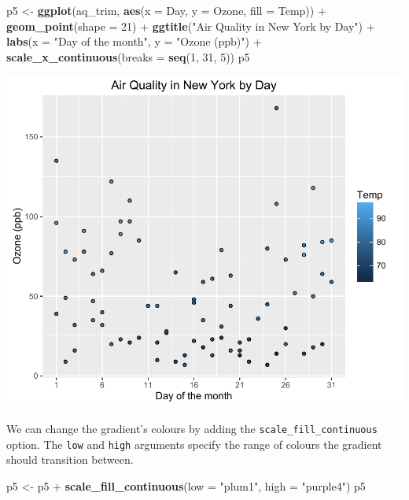 \documentclass[]{article}
\newenvironment{Shaded}{\begin{snugshade}}{\end{snugshade}}
\newcommand{\KeywordTok}[1]{\textcolor[rgb]{0.13,0.29,0.53}{\textbf{{#1}}}}
\newcommand{\DataTypeTok}[1]{\textcolor[rgb]{0.13,0.29,0.53}{{#1}}}
\newcommand{\DecValTok}[1]{\textcolor[rgb]{0.00,0.00,0.81}{{#1}}}
\newcommand{\StringTok}[1]{\textcolor[rgb]{0.31,0.60,0.02}{{#1}}}
\newcommand{\NormalTok}[1]{{#1}}
\begin{document}
\begin{Shaded}
\begin{Highlighting}[]
\NormalTok{p5 <-}\StringTok{ }\KeywordTok{ggplot}\NormalTok{(aq_trim, }\KeywordTok{aes}\NormalTok{(}\DataTypeTok{x =} \NormalTok{Day, }\DataTypeTok{y =} \NormalTok{Ozone, }\DataTypeTok{fill =} \NormalTok{Temp)) +}\StringTok{ }
\StringTok{  }\KeywordTok{geom_point}\NormalTok{(}\DataTypeTok{shape =} \DecValTok{21}\NormalTok{) +}
\StringTok{  }\KeywordTok{ggtitle}\NormalTok{(}\StringTok{"Air Quality in New York by Day"}\NormalTok{) +}\StringTok{ }
\StringTok{  }\KeywordTok{labs}\NormalTok{(}\DataTypeTok{x =} \StringTok{"Day of the month"}\NormalTok{, }\DataTypeTok{y =} \StringTok{"Ozone (ppb)"}\NormalTok{) +}
\StringTok{  }\KeywordTok{scale_x_continuous}\NormalTok{(}\DataTypeTok{breaks =} \KeywordTok{seq}\NormalTok{(}\DecValTok{1}\NormalTok{, }\DecValTok{31}\NormalTok{, }\DecValTok{5}\NormalTok{))}
\NormalTok{p5}
\end{Highlighting}
\end{Shaded}

\begin{center}\includegraphics{5_Scatter_Plots_pdf/scatter_7-1} \end{center}

We can change the gradient's colours by adding the
\texttt{scale\_fill\_continuous} option. The \texttt{low} and
\texttt{high} arguments specify the range of colours the gradient should
transition between.

\begin{Shaded}
\begin{Highlighting}[]
\NormalTok{p5 <-}\StringTok{  }\NormalTok{p5 +}\StringTok{ }\KeywordTok{scale_fill_continuous}\NormalTok{(}\DataTypeTok{low =} \StringTok{"plum1"}\NormalTok{, }\DataTypeTok{high =} \StringTok{"purple4"}\NormalTok{)}
\NormalTok{p5}
\end{Highlighting}
\end{Shaded}
\end{document}
